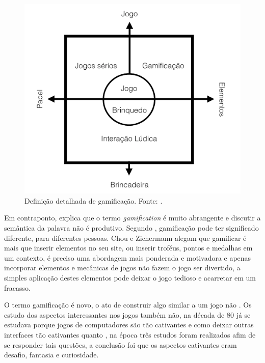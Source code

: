 \begin{figure}[h]
	\centering
		\includegraphics[keepaspectratio=true,scale=0.3]{figuras/deterding.png}
	\caption{Definição detalhada de gamificação. Fonte: \cite{deterding2011gamification}.\label{deterdingfig}
}
\end{figure}

\newpage


 Em contraponto, \cite{chou2015actionable} explica que o termo \textit{gamification} é muito abrangente e discutir a semântica da palavra não é produtivo.  Segundo \cite{zichermann2011gamification}, gamificação pode ter significado diferente, para diferentes pessoas. Chou e Zichermann alegam que gamificar é mais que inserir elementos no seu site, ou inserir troféus, pontos e medalhas em um contexto, é preciso uma abordagem mais ponderada e motivadora e apenas incorporar elementos e mecânicas de jogos não fazem o jogo ser divertido, a simples aplicação destes elementos pode deixar o jogo tedioso e acarretar em um fracasso.

 O termo gamificação é novo, o ato de construir algo similar a um jogo não \cite{chou2015actionable}. Os estudo dos aspectos interessantes nos jogos também não, na década de 80 já se estudava porque jogos de computadores são tão cativantes e como deixar outras interfaces tão cativantes quanto \cite{malone1982heuristics}, na época três estudos foram realizados afim de se responder tais questões, a conclusão foi que os aspectos cativantes eram desafio, fantasia e curiosidade. 

